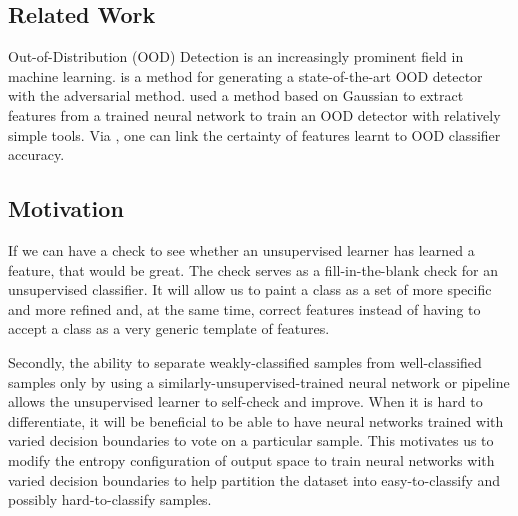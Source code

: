 \documentclass[journal]{journal}
\begin{document}
\subsection{Related Work}
Out-of-Distribution (OOD) Detection is an increasingly prominent field in machine learning. \cite{pidhorskyi2018generative} is a method for generating a state-of-the-art OOD detector with the adversarial method. \cite{lee2018simple} used a method based on Gaussian to extract features from a trained neural network to train an OOD detector with relatively simple tools. Via \cite{lee2018simple}, one can link the certainty of features learnt to OOD classifier accuracy. 

\subsection{Motivation}
If we can have a check to see whether an unsupervised learner has learned a feature, that would be great. The check serves as a fill-in-the-blank check for an unsupervised classifier. It will allow us to paint a class as a set of more specific and more refined and, at the same time, correct features instead of having to accept a class as a very generic template of features.

Secondly, the ability to separate weakly-classified samples from well-classified samples only by using a similarly-unsupervised-trained neural network or pipeline allows the unsupervised learner to self-check and improve. When it is hard to differentiate, it will be beneficial to be able to have neural networks trained with varied decision boundaries to vote on a particular sample. This motivates us to modify the entropy configuration of output space to train neural networks with varied decision boundaries to help partition the dataset into easy-to-classify and possibly hard-to-classify samples. 
\end{document}
